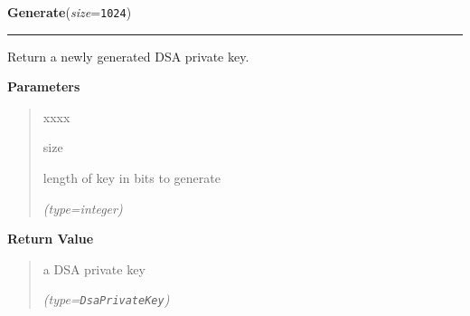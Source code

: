\hspace{.8\funcindent}\begin{boxedminipage}{\funcwidth}

    \raggedright \textbf{Generate}(\textit{size}={\tt 1024})

    \vspace{-1.5ex}

    \rule{\textwidth}{0.5\fboxrule}
\setlength{\parskip}{2ex}
    Return a newly generated DSA private key.

\setlength{\parskip}{1ex}
      \textbf{Parameters}
      \vspace{-1ex}

      \begin{quote}
        \begin{Ventry}{xxxx}

          \item[size]

          length of key in bits to generate

            {\it (type=integer)}

        \end{Ventry}

      \end{quote}

      \textbf{Return Value}
    \vspace{-1ex}

      \begin{quote}
      a DSA private key

      {\it (type=\texttt{DsaPrivateKey})}

      \end{quote}

    \end{boxedminipage}

    \label{keyczar:keys:DsaPrivateKey:Read}

    \vspace{0.5ex}

